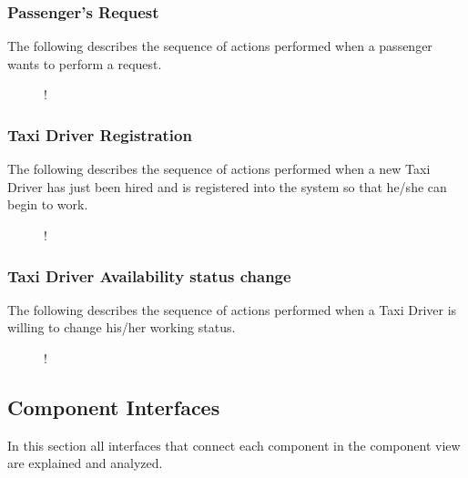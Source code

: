 \subsubsection{Passenger's Request}
The following describes the sequence of actions performed when a passenger wants to perform a request. 
\begin{figure}[H]
	\small
	\centering
	\resizebox{6in}
	{!}{}
\end{figure}
\break
\subsubsection{Taxi Driver Registration}
The following describes the sequence of actions performed when a new Taxi Driver has just been hired and is registered into the system so that he/she can begin to work.
\begin{figure}[H]
	\small
	\centering
	\resizebox{6in}
	{!}{}
\end{figure}
\break
\subsubsection{Taxi Driver Availability status change}
The following describes the sequence of actions performed when a Taxi Driver is willing to change his/her working status.
\begin{figure}[H]
	\small
	\centering
	\resizebox{6in}
	{!}{}
\end{figure}
\subsection{Component Interfaces}
\label{sec:interfaces}
In this section all interfaces that connect each component in the component view are explained and analyzed.
